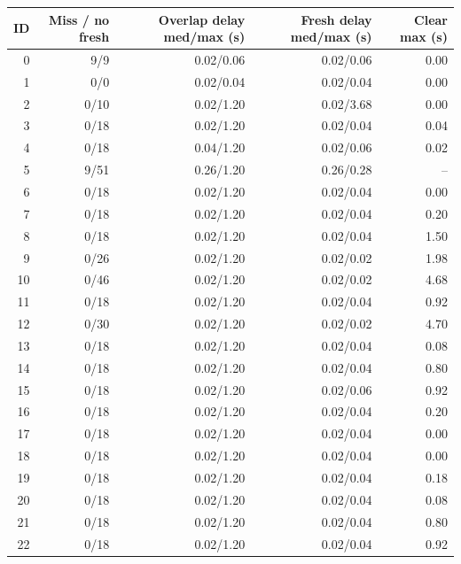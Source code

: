 \begin{tabular}{rrrrr}
\toprule
ID & Miss / no fresh & Overlap delay med/max (s) & Fresh delay med/max (s) & Clear max (s) \\
\midrule
0 & 9/9 & 0.02/0.06 & 0.02/0.06 & 0.00 \\
1 & 0/0 & 0.02/0.04 & 0.02/0.04 & 0.00 \\
2 & 0/10 & 0.02/1.20 & 0.02/3.68 & 0.00 \\
3 & 0/18 & 0.02/1.20 & 0.02/0.04 & 0.04 \\
4 & 0/18 & 0.04/1.20 & 0.02/0.06 & 0.02 \\
5 & 9/51 & 0.26/1.20 & 0.26/0.28 & -- \\
6 & 0/18 & 0.02/1.20 & 0.02/0.04 & 0.00 \\
7 & 0/18 & 0.02/1.20 & 0.02/0.04 & 0.20 \\
8 & 0/18 & 0.02/1.20 & 0.02/0.04 & 1.50 \\
9 & 0/26 & 0.02/1.20 & 0.02/0.02 & 1.98 \\
10 & 0/46 & 0.02/1.20 & 0.02/0.02 & 4.68 \\
11 & 0/18 & 0.02/1.20 & 0.02/0.04 & 0.92 \\
12 & 0/30 & 0.02/1.20 & 0.02/0.02 & 4.70 \\
13 & 0/18 & 0.02/1.20 & 0.02/0.04 & 0.08 \\
14 & 0/18 & 0.02/1.20 & 0.02/0.04 & 0.80 \\
15 & 0/18 & 0.02/1.20 & 0.02/0.06 & 0.92 \\
16 & 0/18 & 0.02/1.20 & 0.02/0.04 & 0.20 \\
17 & 0/18 & 0.02/1.20 & 0.02/0.04 & 0.00 \\
18 & 0/18 & 0.02/1.20 & 0.02/0.04 & 0.00 \\
19 & 0/18 & 0.02/1.20 & 0.02/0.04 & 0.18 \\
20 & 0/18 & 0.02/1.20 & 0.02/0.04 & 0.08 \\
21 & 0/18 & 0.02/1.20 & 0.02/0.04 & 0.80 \\
22 & 0/18 & 0.02/1.20 & 0.02/0.04 & 0.92 \\
\bottomrule
\end{tabular}
